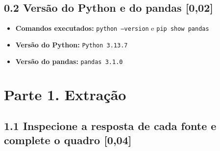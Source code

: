 \documentclass[11pt,a4paper]{article}
\begin{document}
\subsection*{0.2 Versão do Python e do pandas \textnormal{[0,02]}}
\begin{itemize}
    \item \textbf{Comandos executados:} \texttt{python --version} e \texttt{pip show pandas}
    \item \textbf{Versão do Python:} \texttt{Python 3.13.7}
    \item \textbf{Versão do pandas:} \texttt{pandas 3.1.0}
\end{itemize}

\section*{Parte 1. Extração}

\subsection*{1.1 Inspecione a resposta de cada fonte e complete o quadro \textnormal{[0,04]}}
\end{document}
